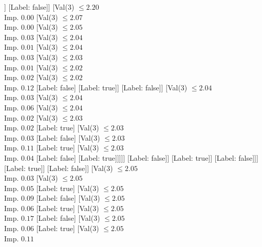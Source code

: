 \documentclass[margin=10pt]{standalone}
\begin{document}
\begin{forest}
							[Val($3$) $ \leq 2.02$ \\ Imp. $0.44$
								[Label: false]
								[Label: true]]
							[Label: false]]
						[Val($3$) $ \leq 2.20$ \\ Imp. $0.00$
							[Val($3$) $ \leq 2.07$ \\ Imp. $0.00$
								[Val($3$) $ \leq 2.05$ \\ Imp. $0.03$
									[Val($3$) $ \leq 2.04$ \\ Imp. $0.01$
										[Val($3$) $ \leq 2.04$ \\ Imp. $0.03$
											[Val($3$) $ \leq 2.03$ \\ Imp. $0.01$
												[Val($3$) $ \leq 2.02$ \\ Imp. $0.02$
													[Val($3$) $ \leq 2.02$ \\ Imp. $0.12$
														[Label: false]
														[Label: true]]
													[Label: false]]
												[Val($3$) $ \leq 2.04$ \\ Imp. $0.03$
													[Val($3$) $ \leq 2.04$ \\ Imp. $0.06$
														[Val($3$) $ \leq 2.04$ \\ Imp. $0.02$
															[Val($3$) $ \leq 2.03$ \\ Imp. $0.02$
																[Label: true]
																[Val($3$) $ \leq 2.03$ \\ Imp. $0.03$
																	[Label: false]
																	[Val($3$) $ \leq 2.03$ \\ Imp. $0.11$
																		[Label: true]
																		[Val($3$) $ \leq 2.03$ \\ Imp. $0.04$
																			[Label: false]
																			[Label: true]]]]]
															[Label: false]]
														[Label: true]]
													[Label: false]]]
											[Label: true]]
										[Label: false]]
									[Val($3$) $ \leq 2.05$ \\ Imp. $0.03$
										[Val($3$) $ \leq 2.05$ \\ Imp. $0.05$
											[Label: true]
											[Val($3$) $ \leq 2.05$ \\ Imp. $0.09$
												[Label: false]
												[Val($3$) $ \leq 2.05$ \\ Imp. $0.06$
													[Label: true]
													[Val($3$) $ \leq 2.05$ \\ Imp. $0.17$
														[Label: false]
														[Val($3$) $ \leq 2.05$ \\ Imp. $0.06$
															[Label: true]
															[Val($3$) $ \leq 2.05$ \\ Imp. $0.11$

\end{forest}
\end{document}
